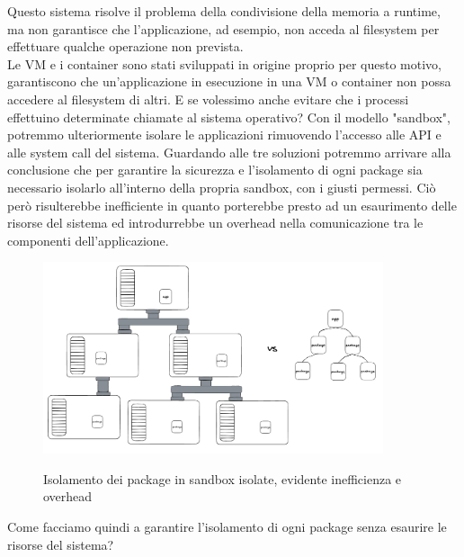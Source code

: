 Questo sistema risolve il problema della condivisione della memoria a runtime, ma non garantisce che l'applicazione, ad
esempio, non acceda al filesystem per effettuare qualche operazione non prevista.\\ 
Le VM e i container sono stati sviluppati in origine proprio per questo motivo, garantiscono che un'applicazione in
esecuzione in una VM o container non possa accedere al filesystem di altri. E se volessimo anche evitare che i processi
effettuino determinate chiamate al sistema operativo? Con il modello "sandbox", potremmo ulteriormente isolare le
applicazioni rimuovendo l'accesso alle API e alle system call del sistema. Guardando alle tre soluzioni potremmo
arrivare alla conclusione che per garantire la sicurezza e l'isolamento di ogni package sia necessario isolarlo
all'interno della propria sandbox, con i giusti permessi. Ciò però risulterebbe inefficiente in quanto porterebbe presto
ad un esaurimento delle risorse del sistema ed introdurrebbe un overhead nella comunicazione tra le componenti
dell'applicazione.
\begin{figure}[H]
    \centering
    \captionsetup{justification=centering}
    \includegraphics[width=10cm]{./chapters/2.wasi-in-depth/images/3.package_isolation_processes.png}
    \label{process_package_in_sandbox}
    \caption{Isolamento dei package in sandbox isolate, evidente inefficienza e overhead}
\end{figure}
Come facciamo quindi a garantire l'isolamento di ogni package senza esaurire le risorse del sistema?
